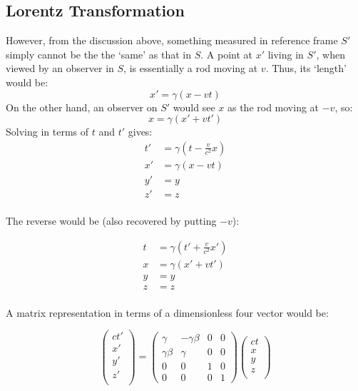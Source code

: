\documentclass[12pt]{article}
\begin{document}
\subsection{Lorentz Transformation}
However, from the discussion above, something measured in reference frame $S'$ simply cannot be the the `same' as that in $S$. A point at $x'$ living in $S'$, when viewed by an observer in $S$, is essentially a rod moving at $v$. Thus, its `length' would be:
\[ x' = \gamma(x-vt)\]
On the other hand, an observer on $S'$ would see $x$ as the rod moving at $-v$, so:
\[ x = \gamma(x' + vt')\]
Solving in terms of $t$ and $t'$ gives:
\begin{align*}
    t' &= \gamma\left(t-\frac{v}{c^2}x\right)\\
    x' &= \gamma(x - vt)\\
    y' &= y\\
    z' &= z\\
\end{align*}

The reverse would be (also recovered by putting $-v$):

\begin{align*}
    t &= \gamma\left(t'+\frac{v}{c^2}x'\right)\\
    x &= \gamma(x' + vt')\\
    y &= y\\
    z &= z\\
\end{align*}

A matrix representation in terms of a dimensionless four vector would be:

\[
\begin{pmatrix}
ct'\\
x'\\
y'\\
z'\\
\end{pmatrix}
=
\begin{pmatrix}
\gamma &-\gamma\beta &0 &0\\
\gamma \beta &\gamma & 0 & 0\\
0 &0 & 1 & 0\\
0& 0&0&1
\end{pmatrix}
\begin{pmatrix}
ct\\
x\\
y\\
z\\
\end{pmatrix}
\]
\end{document}
